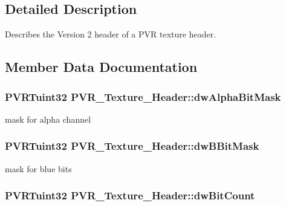\subsection{Detailed Description}
Describes the Version 2 header of a P\+V\+R texture header. 



 

\subsection{Member Data Documentation}
\hypertarget{struct_p_v_r___texture___header_a0730c4fe3dbf1550d163d8ed94e642cf}{
\subsubsection[{dw\+Alpha\+Bit\+Mask}]{\setlength{\rightskip}{0pt plus 5cm}P\+V\+R\+Tuint32 P\+V\+R\+\_\+\+Texture\+\_\+\+Header\+::dw\+Alpha\+Bit\+Mask}}\label{struct_p_v_r___texture___header_a0730c4fe3dbf1550d163d8ed94e642cf}
mask for alpha channel \hypertarget{struct_p_v_r___texture___header_ae4bf9b63a63468bc73ed2afe27dc1560}{
\subsubsection[{dw\+B\+Bit\+Mask}]{\setlength{\rightskip}{0pt plus 5cm}P\+V\+R\+Tuint32 P\+V\+R\+\_\+\+Texture\+\_\+\+Header\+::dw\+B\+Bit\+Mask}}\label{struct_p_v_r___texture___header_ae4bf9b63a63468bc73ed2afe27dc1560}
mask for blue bits \hypertarget{struct_p_v_r___texture___header_ae2c37c28d0442ab00c4a860cc8240e14}{
\subsubsection[{dw\+Bit\+Count}]{\setlength{\rightskip}{0pt plus 5cm}P\+V\+R\+Tuint32 P\+V\+R\+\_\+\+Texture\+\_\+\+Header\+::dw\+Bit\+Count}}\label{struct_p_v_r___texture___header_ae2c37c28d0442ab00c4a860cc8240e14}
